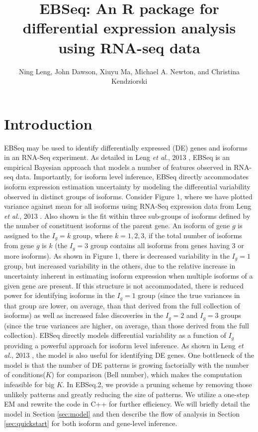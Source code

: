 \documentclass{article}
\begin{document}

\title{EBSeq: An R package for differential expression analysis using RNA-seq data}
\author{Ning Leng, John Dawson, Xiuyu Ma, Michael A. Newton, and Christina Kendziorski}
\maketitle
\tableofcontents
\setcounter{tocdepth}{2}

\section{Introduction}
EBSeq may be used to identify differentially expressed (DE)
genes and isoforms in an RNA-Seq experiment. As detailed in
Leng {\it et al.}, 2013 \cite{Leng13}, 
EBSeq is an empirical Bayesian approach that models a number of features
observed in RNA-seq data. Importantly, for isoform level inference,
EBSeq directly accommodates isoform expression estimation uncertainty by
modeling the differential variability observed in distinct groups of isoforms.
Consider Figure 1, where we have plotted variance against mean
for all isoforms using RNA-Seq expression data from Leng {\it et al.}, 2013 \cite{Leng13}.
Also shown is the fit within three sub-groups of isoforms defined
by the number of constituent isoforms of the parent gene.
An isoform of gene $g$ is assigned to the $I_g=k$ group, where $k=1,2,3$,
if the total number of isoforms from gene $g$ is $k$ (the $I_g=3$ group contains
all isoforms from genes having 3 or more isoforms).
As shown in Figure 1, there is decreased variability in the $I_g=1$ group,
but increased variability in the others, due to the relative increase in
uncertainty inherent in estimating isoform expression when multiple isoforms of a given gene are
present.  If this structure is not accommodated, there is reduced power for
identifying isoforms in the $I_g=1$ group (since the true variances in that group are
lower, on average, than that derived from the full collection of isoforms) as well as increased
false discoveries in the $I_g=2$ and $I_g=3$ groups (since the true variances are higher, on average,
than those derived from the full collection). EBSeq directly models differential variability
as a function of $I_g$ providing a powerful approach for isoform level inference. As shown in Leng {\it et al.}, 2013
\cite{Leng13}, the model is also useful for identifying DE genes.
One bottleneck of the model is that the number of DE patterns is growing factorially with the number of conditions($K$) for comparison (Bell number), which makes the computation infeasible for big $K$. In EBSeq.2, we provide a pruning scheme by removing those unlikely patterns and greatly reducing the size of patterns. We utilize a one-step EM and rewrite the code in C++ for further efficiency.
We will briefly detail the model in Section \ref{sec:model} and then describe
the flow of analysis in Section \ref{sec:quickstart} for both isoform and gene-level inference.
\end{document}
